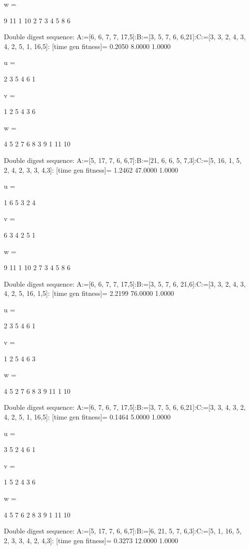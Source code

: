 w =

     9    11     1    10     2     7     3     4     5     8     6

Double digest sequence:
A:=[6, 6, 7, 7, 17,5]:B:=[3, 5, 7, 6, 6,21]:C:=[3, 3, 2, 4, 3, 4, 2, 5, 1, 16,5]:
[time gen fitness]=
    0.2050    8.0000    1.0000


u =

     2     3     5     4     6     1


v =

     1     2     5     4     3     6


w =

     4     5     2     7     6     8     3     9     1    11    10

Double digest sequence:
A:=[5, 17, 7, 6, 6,7]:B:=[21, 6, 6, 5, 7,3]:C:=[5, 16, 1, 5, 2, 4, 2, 3, 3, 4,3]:
[time gen fitness]=
    1.2462   47.0000    1.0000


u =

     1     6     5     3     2     4


v =

     6     3     4     2     5     1


w =

     9    11     1    10     2     7     3     4     5     8     6

Double digest sequence:
A:=[6, 6, 7, 7, 17,5]:B:=[3, 5, 7, 6, 21,6]:C:=[3, 3, 2, 4, 3, 4, 2, 5, 16, 1,5]:
[time gen fitness]=
    2.2199   76.0000    1.0000


u =

     2     3     5     4     6     1


v =

     1     2     5     4     6     3


w =

     4     5     2     7     6     8     3     9    11     1    10

Double digest sequence:
A:=[6, 7, 6, 7, 17,5]:B:=[3, 7, 5, 6, 6,21]:C:=[3, 3, 4, 3, 2, 4, 2, 5, 1, 16,5]:
[time gen fitness]=
    0.1464    5.0000    1.0000


u =

     3     5     2     4     6     1


v =

     1     5     2     4     3     6


w =

     4     5     7     6     2     8     3     9     1    11    10

Double digest sequence:
A:=[5, 17, 7, 6, 6,7]:B:=[6, 21, 5, 7, 6,3]:C:=[5, 1, 16, 5, 2, 3, 3, 4, 2, 4,3]:
[time gen fitness]=
    0.3273   12.0000    1.0000


